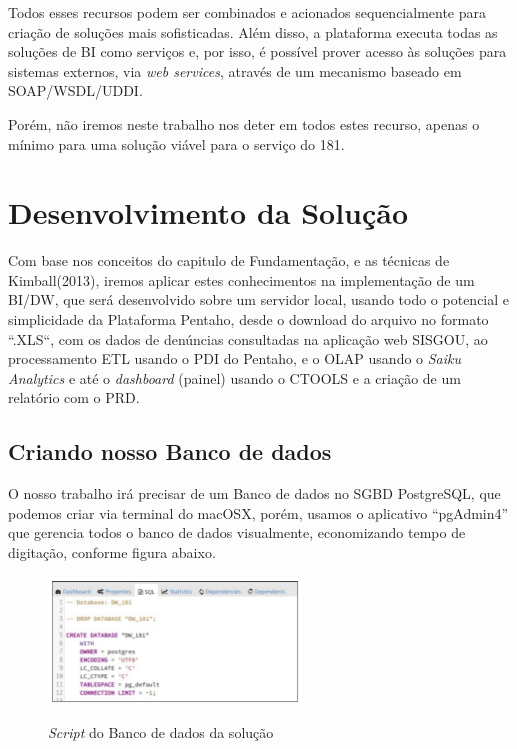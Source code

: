 Todos esses recursos podem ser combinados e acionados sequencialmente para cria\c{c}\~{a}o de solu\c{c}\~{o}es 
mais sofisticadas. Al\'{e}m disso, a plataforma executa todas as solu\c{c}\~{o}es de BI como servi\c{c}os e, 
por isso, \'{e} poss\'{i}vel prover acesso \`{a}s solu\c{c}\~{o}es para sistemas externos, via 
\textit{web services}, atrav\'{e}s de um mecanismo baseado em SOAP/WSDL/UDDI.

Por\'{e}m, n\~{a}o iremos neste trabalho nos deter em todos estes recurso, apenas o m\'{i}nimo para 
uma solu\c{c}\~{a}o vi\'{a}vel para o servi\c{c}o do 181.


\section{Desenvolvimento da Solu\c{c}\~{a}o}

Com base nos conceitos do capitulo de Fundamenta\c{c}\~{a}o, e as t\'{e}cnicas de Kimball(2013), 
iremos aplicar estes conhecimentos na implementa\c{c}\~{a}o de um BI/DW, que ser\'{a} desenvolvido 
sobre um servidor local, usando todo o potencial e simplicidade da Plataforma Pentaho, desde o download 
do arquivo no formato ``.XLS``, com os dados de denúncias consultadas na aplica\c{c}\~{a}o web SISGOU, ao 
processamento ETL usando o PDI do Pentaho, e o OLAP usando o \textit{Saiku Analytics} e at\'{e} o 
\textit{dashboard} (painel) usando o CTOOLS e a cria\c{c}\~{a}o de um relat\'orio com o PRD.

\subsection{Criando nosso Banco de dados}

O nosso trabalho ir\'{a} precisar de um Banco de dados no SGBD PostgreSQL, que podemos 
criar via terminal do macOSX, por\'{e}m, usamos o aplicativo ``pgAdmin4''
que gerencia todos o banco de dados visualmente, economizando tempo de digita\c{c}\~{a}o, conforme figura abaixo.

\begin{figure}[H]
	\vspace*{0,2cm}
    \centering
    \caption{\textit{Script} do Banco de dados da solu\c{c}\~{a}o}
    \includegraphics[width=0.6\textwidth]{./04-figuras/figura-16}
    \label{fig:ilustfig16}
\end{figure}
\vspace*{-0,9cm}
{\raggedright {}} \\


